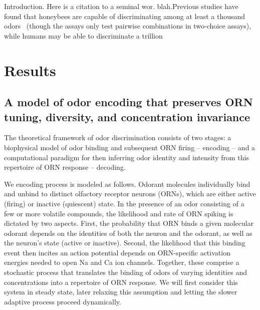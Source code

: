 
Introduction. Here is a citation to a seminal wor. blah.Previous studies have found that honeybees are capable of discriminating among at least a thousand odors~\cite{bees_odors} (though the assays only test pairwise combinations in two-choice assays), while humans may be able to discriminate a trillion~\cite{trillion_odors}

\section*{Results}

\subsection*{A model of odor encoding that preserves ORN tuning, diversity, and concentration invariance}

The theoretical framework of odor discrimination consists of two stages: a biophysical model of odor binding and subsequent ORN firing -- encoding -- and a computational paradigm for then inferring odor identity and intensity from this repertoire of ORN response -- decoding. 

We encoding process is modeled as follows. Odorant molecules individually bind and unbind to distinct olfactory receptor neurons (ORNs), which are either active (firing) or inactive (quiescent) state. In the presence of an odor consisting of a few or more volatile compounds, the likelihood and rate of ORN spiking is dictated by two aspects. First, the probability that ORN binds a given molecular odorant depends on the identities of both the neuron and the odorant, as well as the neuron's state (active or inactive). Second, the likelihood that this binding event then incites an action potential depends on ORN-specific activation energies needed to open Na and Ca ion channels. Together, these comprise a stochastic process that translates the binding of odors of varying identities and concentrations into a repertoire of ORN response. We will first consider this system in steady state, later relaxing this assumption and letting the slower adaptive process proceed dynamically. 




